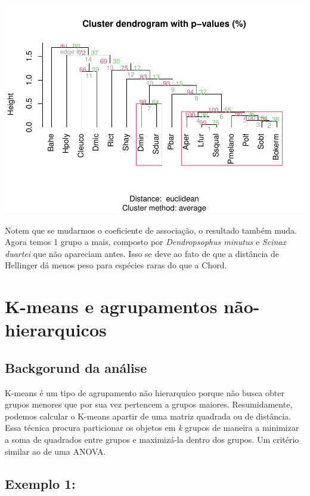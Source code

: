 \documentclass[
]{book}
\begin{document}
\includegraphics{livro_r_ecologia_files/figure-latex/unnamed-chunk-30-1.pdf}

Notem que se mudarmos o coeficiente de associação, o resultado também muda. Agora temos 1 grupo a mais, composto por \emph{Dendropsophus minutus} e \emph{Scinax duartei} que não apareciam antes. Isso se deve ao fato de que a distância de Hellinger dá menos peso para espécies raras do que a Chord.

\hypertarget{k-means-e-agrupamentos-nuxe3o-hierarquicos}{%
\chapter{K-means e agrupamentos não-hierarquicos}\label{k-means-e-agrupamentos-nuxe3o-hierarquicos}}

\hypertarget{backgorund-da-anuxe1lise-1}{%
\section{Backgorund da análise}\label{backgorund-da-anuxe1lise-1}}

K-means é um tipo de agrupamento não hierarquico porque não busca obter grupos menores que por sua vez pertencem a grupos maiores. Resumidamente, podemos calcular o K-means apartir de uma matriz quadrada ou de distância. Essa técnica procura particionar os objetos em \emph{k} grupos de maneira a minimizar a soma de quadrados entre grupos e maximizá-la dentro dos grupos. Um critério similar ao de uma ANOVA.

\hypertarget{exemplo-1-1}{%
\section{Exemplo 1:}\label{exemplo-1-1}}
\end{document}
